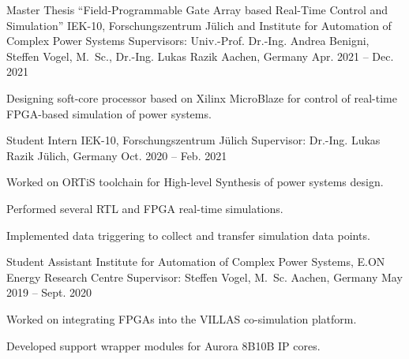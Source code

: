 
\begin{cvexperience}

\cvposition
	{Master Thesis \quad\textbar\quad ``Field-Programmable Gate Array based Real-Time Control and Simulation''} %
	{IEK-10, Forschungszentrum J\"ulich and Institute for Automation of Complex Power Systems} %
	{Supervisors: Univ.-Prof. Dr.-Ing. Andrea Benigni, Steffen Vogel, M.\, Sc., Dr.-Ing. Lukas Razik} %
	{Aachen, Germany} %
	{Apr. 2021 -- Dec. 2021} %
	{\begin{cvitems}
		\item Designing soft-core processor based on Xilinx MicroBlaze for control of real-time FPGA-based simulation of power systems.
	\end{cvitems}}

\cvposition
	{Student Intern} %
	{IEK-10, Forschungszentrum J\"ulich} %
	{Supervisor: Dr.-Ing. Lukas Razik} %
	{J\"ulich, Germany} %
	{Oct. 2020 -- Feb. 2021} %
	{\begin{cvitems}
		\item Worked on ORTiS toolchain for High-level Synthesis of power systems design.
		\item Performed several RTL and FPGA real-time simulations.
		\item Implemented data triggering to collect and transfer simulation data points.
	\end{cvitems}}

\cvposition
	{Student Assistant} %
	{Institute for Automation of Complex Power Systems, E.ON Energy Research Centre} %
	{Supervisor: Steffen Vogel, M.\, Sc.} %
	{Aachen, Germany} %
	{May 2019 -- Sept. 2020} %
	{\begin{cvitems}
		\item Worked on integrating FPGAs into the VILLAS co-simulation platform.
		\item Developed support wrapper modules for Aurora 8B10B IP cores.
	\end{cvitems}}


\end{cvexperience}
